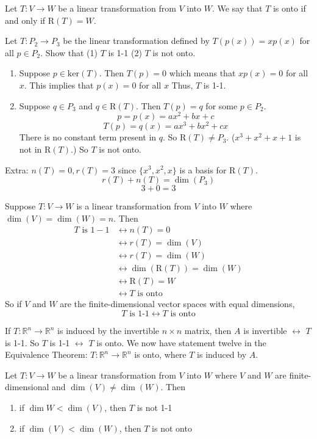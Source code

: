 \documentclass[12pt]{article}
\begin{document}
\begin{definition} Let $T: V \to W$ be a linear transformation from $V$ into $W$. We say that $T$ is onto if and only if $\mathrm{R}(T) = W$. \end{definition} 
\begin{example} Let $T: P_2 \to P_3$ be the linear transformation defined by $T(p(x)) = xp(x)$ for all $p \in P_2$. Show that (1) $T$ is 1-1 (2) $T$ is not onto. \begin{enumerate} 
\item Suppose $p \in \mathrm{ker}(T)$. Then $T(p) = 0$ which means that $xp(x) = 0$ for all $x$. This implies that $p(x) = 0$ for all $x$ Thus, $T$ is 1-1. 
\item Suppose $q \in P_3$ and $q \in \mathrm{R}(T)$. Then $T(p) = q$ for some $p \in P_2$. $$p = p(x) = ax^2 + bx + c$$ $$T(p) = q(x) = ax^3 + bx^2 + cx $$ There is no constant term present in $q$. So $\mathrm{R}(T) \neq P_3$. ($x^3 + x^2 + x + 1$ is not in $\mathrm{R}(T)$.) So $T$ is not onto. \end{enumerate} 
Extra: $n(T) = 0, r(T) = 3$ since $\{x^3, x^2, x\}$ is a basis for $\mathrm{R}(T)$. $$r(T) + n(T) = \dim(P_3)$$ $$3 + 0 = 3$$ \end{example} 
Suppose $T: V \to W$ is a linear transformation from $V$ into $W$ where $\dim(V) = \dim(W) = n$. Then $$\begin{aligned} T \text{ is } 1-1 &\leftrightarrow n(T) = 0 \\ &\leftrightarrow r(T) = \dim(V) \\ &\leftrightarrow r(T) = \dim(W) \\ &\leftrightarrow \dim(\mathrm{R}(T)) = \dim(W) \\ &\leftrightarrow \mathrm{R}(T) = W \\ &\leftrightarrow T \text{ is onto} \end{aligned} $$ So if $V$ and $W$ are the finite-dimensional vector spaces with equal dimensions, $$T \text{ is 1-1} \leftrightarrow T \text{ is onto} $$ 
\begin{theorem} If $T: \mathbb{R}^n \to \mathbb{R}^n$ is induced by the invertible $n \times n$ matrix, then $A$ is invertible $\leftrightarrow$ $T$ is 1-1. So $T$ is 1-1 $\leftrightarrow$ $T$ is onto. We now have statement twelve in the Equivalence Theorem: $T: \mathbb{R}^n \to \mathbb{R}^n$ is onto, where $T$ is induced by $A$. \end{theorem} 
\begin{theorem} Let $T: V \to W$ be a linear transformation from $V$ into $W$ where $V$ and $W$ are finite-dimensional and $\dim(V) \neq \dim(W)$. Then \begin{enumerate} 
\item if $\dim{W} < \dim(V)$, then $T$ is not 1-1 \item if $\dim(V) < \dim(W)$, then $T$ is not onto \end{enumerate} \end{theorem} 
\end{document}
